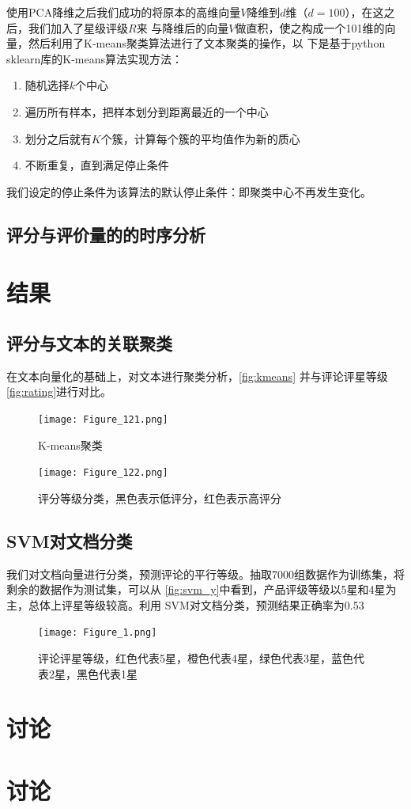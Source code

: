 使用PCA降维之后我们成功的将原本的高维向量$V$降维到$d$维（$d=100$），在这之后，我们加入了星级评级$R$来
与降维后的向量$V$做直积，使之构成一个101维的向量，然后利用了K-means聚类算法进行了文本聚类的操作，以
下是基于python sklearn库的K-means算法实现方法：
\begin{enumerate}
    \item 随机选择$k$个中心
    \item 遍历所有样本，把样本划分到距离最近的一个中心
    \item 划分之后就有$K$个簇，计算每个簇的平均值作为新的质心
    \item 不断重复，直到满足停止条件
\end{enumerate}
我们设定的停止条件为该算法的默认停止条件：即聚类中心不再发生变化。

\section{评分与评价量的的时序分析}

\chapter{结果}

\section{评分与文本的关联聚类}
在文本向量化的基础上，对文本进行聚类分析，\autoref{fig:kmeans}
并与评论评星等级\autoref{fig:rating}进行对比。

\begin{figure}
    \centering
    \texttt{[image: Figure\_121.png]}
    \caption{K-means聚类}
    \label{fig:kmeans}
\end{figure}


\begin{figure}
    \centering
    \texttt{[image: Figure\_122.png]}
    \caption{评分等级分类，黑色表示低评分，红色表示高评分}
    \label{fig:rating}
\end{figure}

\section{SVM对文档分类}

我们对文档向量进行分类，预测评论的平行等级。抽取7000组数据作为训练集，将剩余的数据作为测试集，可以从
\autoref{fig:svm_y}中看到，产品评级等级以5星和4星为主，总体上评星等级较高。利用
SVM对文档分类，预测结果正确率为0.53
\begin{figure}
    \centering
    \texttt{[image: Figure\_1.png]}
    \caption{评论评星等级，红色代表5星，橙色代表4星，绿色代表3星，蓝色代表2星，黑色代表1星}
    \label{fig:svm_y}
\end{figure}


\chapter{讨论}

\section{}


\chapter{讨论}
